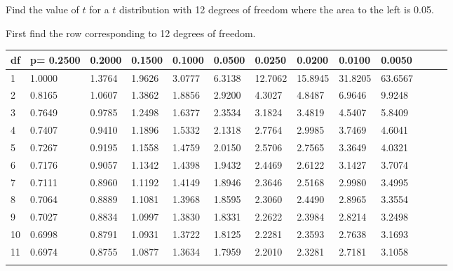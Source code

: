 \begin{frame}{\small Find the value of $t$ for a $t$ distribution with
    12 degrees of freedom where the area to the left is 0.05.}
  
{\small First find the row corresponding to 12 degrees of freedom.}

  {
\fontsize{5pt}{5pt}
\selectfont
\begin{tabular}{l|llllllllllll} 
df  & p= 0.2500  &  0.2000  &  0.1500  &  0.1000  &  0.0500  &  0.0250  &  0.0200  &  0.0100  &  0.0050     \\\hline 
  1 & 1.0000 & 1.3764 & 1.9626 & 3.0777 & 6.3138 & 12.7062 & 15.8945 & 31.8205 & 63.6567  \\[5pt] \arrayrulecolor{light-gray}\hline\arrayrulecolor{black}  
  2 & 0.8165 & 1.0607 & 1.3862 & 1.8856 & 2.9200 & 4.3027 & 4.8487 & 6.9646 & 9.9248  \\[5pt] \arrayrulecolor{light-gray}\hline\arrayrulecolor{black}  
  3 & 0.7649 & 0.9785 & 1.2498 & 1.6377 & 2.3534 & 3.1824 & 3.4819 & 4.5407 & 5.8409  \\[5pt] \arrayrulecolor{light-gray}\hline\arrayrulecolor{black}  
  4 & 0.7407 & 0.9410 & 1.1896 & 1.5332 & 2.1318 & 2.7764 & 2.9985 & 3.7469 & 4.6041  \\[12pt] \arrayrulecolor{light-gray}\hline\arrayrulecolor{black}  
  5 & 0.7267 & 0.9195 & 1.1558 & 1.4759 & 2.0150 & 2.5706 & 2.7565 & 3.3649 & 4.0321  \\[5pt] \arrayrulecolor{light-gray}\hline\arrayrulecolor{black}  
  6 & 0.7176 & 0.9057 & 1.1342 & 1.4398 & 1.9432 & 2.4469 & 2.6122 & 3.1427 & 3.7074  \\[5pt] \arrayrulecolor{light-gray}\hline\arrayrulecolor{black}  
  7 & 0.7111 & 0.8960 & 1.1192 & 1.4149 & 1.8946 & 2.3646 & 2.5168 & 2.9980 & 3.4995  \\[5pt] \arrayrulecolor{light-gray}\hline\arrayrulecolor{black}  
  8 & 0.7064 & 0.8889 & 1.1081 & 1.3968 & 1.8595 & 2.3060 & 2.4490 & 2.8965 & 3.3554  \\[5pt] \arrayrulecolor{light-gray}\hline\arrayrulecolor{black}  
  9 & 0.7027 & 0.8834 & 1.0997 & 1.3830 & 1.8331 & 2.2622 & 2.3984 & 2.8214 & 3.2498  \\[12pt] \arrayrulecolor{light-gray}\hline\arrayrulecolor{black}  
 10 & 0.6998 & 0.8791 & 1.0931 & 1.3722 & 1.8125 & 2.2281 & 2.3593 & 2.7638 & 3.1693  \\[5pt] \arrayrulecolor{light-gray}\hline\arrayrulecolor{black}  
 11 & 0.6974 & 0.8755 & 1.0877 & 1.3634 & 1.7959 & 2.2010 & 2.3281 & 2.7181 & 3.1058  \\[5pt] \arrayrulecolor{light-gray}\hline\arrayrulecolor{black}  

\end{tabular}}
\end{frame}

